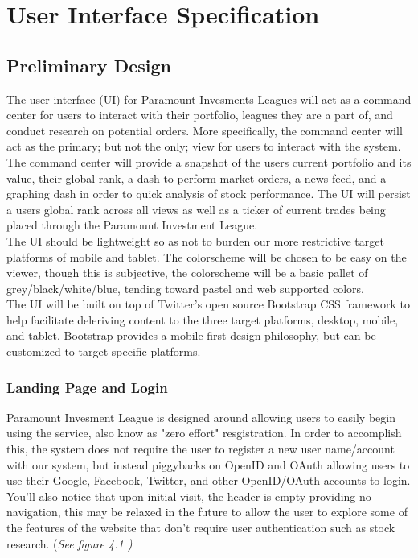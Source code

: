 \chapter{User Interface Specification}
\label{uispec}
\section{Preliminary Design}

The user interface (UI) for Paramount Invesments Leagues will act as a command center
for users to interact with their portfolio, leagues they are a part of, and conduct
research on potential orders. More specifically, the command center will act as the
primary; but not the only; view for users to interact with the system.  The command
center will provide a snapshot of the users current portfolio and its value, their
global rank, a dash to perform market orders, a news feed, and a graphing dash in order
to quick analysis of stock performance.  The UI will persist a users global rank across
all views as well as a ticker of current trades being placed through the Paramount
Investment League.\\

The UI should be lightweight so as not to burden our more restrictive target platforms
of mobile and tablet.  The colorscheme will be chosen to be easy on the viewer, though
this is subjective, the colorscheme will be a basic pallet of grey/black/white/blue,
tending toward pastel and web supported colors.\\

The UI will be built on top of Twitter's open source Bootstrap CSS\cite{wiki:boot}
framework to help
facilitate deleriving content to the three target platforms, desktop, mobile, and tablet.
Bootstrap provides a mobile first design philosophy, but can be customized to target
specific platforms.\\

\subsection{Landing Page and Login}

Paramount Invesment League is designed around allowing users to easily begin using the
service, also know as "zero effort" resgistration. In order to accomplish this, the
system does not require the user to register a new user name/account with our system,
but instead piggybacks on OpenID\cite{wiki:open} and OAuth\cite{wiki:oauth} allowing users to
use their Google,
Facebook, Twitter, and other OpenID/OAuth accounts to login. You'll also notice that
upon initial visit, the header is empty providing no navigation, this may be relaxed in
the future to allow the user to explore some of the features of the website that don't
require user authentication such as stock research. (\em See figure 4.1 \em)\\

